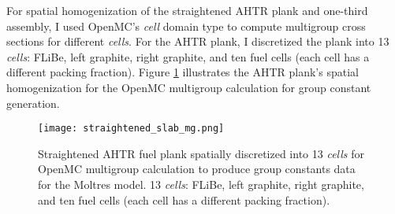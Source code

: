 For spatial homogenization of the straightened \gls{AHTR} plank and 
one-third assembly, I used OpenMC's \textit{cell} domain type to compute 
multigroup cross sections for different \textit{cells}. 
For the \gls{AHTR} plank, I discretized the plank into 13 \textit{cells}:
FLiBe, left graphite, right graphite, and ten fuel cells (each cell has a different 
packing fraction).
Figure \ref{fig:straightened_slab_mg} illustrates the \gls{AHTR} plank's spatial 
homogenization for the OpenMC multigroup calculation for group constant generation. 
\begin{figure}[htbp]
    \centering
    \texttt{[image: straightened\_slab\_mg.png]}
    \raggedright
    \caption{Straightened \acrfull{AHTR} fuel plank spatially discretized into 
    13 \textit{cells} for OpenMC multigroup calculation to produce group constants 
    data for the Moltres model. 13 \textit{cells}:
    FLiBe, left graphite, right graphite, and ten fuel cells (each cell has a different 
    packing fraction).}
    \label{fig:straightened_slab_mg}
\end{figure}

